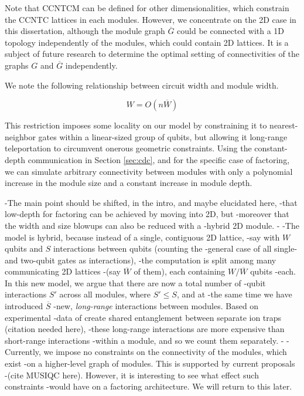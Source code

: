 Note that \textsf{CCNTCM} can be defined for other dimensionalities,
which constrain the \textsf{CCNTC} lattices in each modules.
However, we concentrate on the \textsf{2D} case in this dissertation,
although the module graph $\overline{G}$ could be connected with
a \textsc{1D} topology independently of the modules, which could contain
\textsc{2D} lattices. It is a subject of future research to determine
the optimal setting of connectivities of the graphs $G$
and $\overline{G}$ independently.


We note the following relationship between circuit width and
module width.

\begin{equation}
W = O(n\overline{W})
\label{eqn:module-width}
\end{equation}

This restriction imposes some locality on our model by constraining it to
nearest-neighbor gates within a linear-sized group of qubits, but allowing
it long-range teleportation to circumvent onerous geometric constraints.
Using the constant-depth communication in Section \ref{sec:cdc}, and for
the specific case of factoring, we
can simulate arbitrary connectivity between modules with only a polynomial
increase in the module size and a constant increase in module depth.


-The main point should be shifted, in the intro, and maybe elucidated here,
-that low-depth for factoring can be achieved by moving into 2D, but
-moreover that the width and size blowups can also be reduced with a
-hybrid 2D module.
-
-The model is hybrid, because instead of a single, contiguous 2D lattice,
-say with $W$ qubits and $S$ interactions between qubits (counting the
-general case of all single- and two-qubit gates as interactions),
-the computation is split among many communicating 2D lattices
-(say $\overline{W}$ of them), each containing $W/\overline{W}$ qubits
-each. In this new model, we argue that there are now a total number of
-qubit interactions $S'$ across all modules, where $S' \le S$, and at
-the same time we have introduced $\overline{S}$
-new, \emph{long-range} interactions between modules. Based on experimental
-data of create shared entanglement between separate ion traps (citation needed here),
-these long-range interactions are more expensive than short-range interactions
-within a module, and so we count them separately.
-
-Currently, we impose no constraints on the connectivity of the modules, which exist
-on a higher-level graph of modules. This is supported by current proposals
-(cite MUSIQC here). However, it is interesting to see what effect such constraints
-would have on a factoring architecture. We will return to this later.

